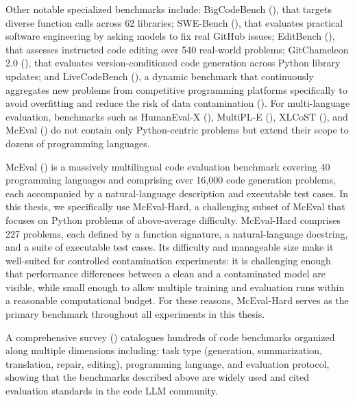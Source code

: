 \documentclass[mscthesis]{usiinfthesis}
\begin{document}
\par\vspace{1em}
Other notable specialized benchmarks include: BigCodeBench (\citet{zhuo2025bigcodebenchbenchmarkingcodegeneration}), that targets diverse function calls across 62 libraries; SWE-Bench (\citet{jimenez2024swebenchlanguagemodelsresolve}), that evaluates practical software engineering by asking models to fix real GitHub issues; EditBench (\citet{chi2025editbenchevaluatingllmabilities}), that assesses instructed code editing over 540 real-world problems; GitChameleon 2.0 (\citet{misra2025gitchameleon20evaluatingai}), that evaluates version-conditioned code generation across Python library updates; and LiveCodeBench (\citet{jain2024livecodebenchholisticcontaminationfree}), a dynamic benchmark that continuously aggregates new problems from competitive programming platforms specifically to avoid overfitting and reduce the risk of data contamination (\citet{koohestani2025benchmarkingaimodelssoftware}). For multi-language evaluation, benchmarks such as HumanEval-X (\citet{zheng2024codegeexpretrainedmodelcode}), MultiPL-E (\citet{cassano2022multiplescalableextensibleapproach}), XLCoST (\citet{koohestani2025benchmarkingaimodelssoftware}), and McEval (\citet{chai2024mcevalmassivelymultilingualcode}) do not contain only Python-centric problems but extend their scope to dozens of programming languages.
\par\vspace{1em}
McEval (\citet{chai2024mcevalmassivelymultilingualcode}) is a massively multilingual code evaluation benchmark covering 40 programming languages and comprising over 16,000 code generation problems, each accompanied by a natural-language description and executable test cases. In this thesis, we specifically use McEval-Hard, a challenging subset of McEval that focuses on Python problems of above-average difficulty. McEval-Hard comprises 227 problems, each defined by a function signature, a natural-language docstring, and a suite of executable test cases. Its difficulty and manageable size make it well-suited for controlled contamination experiments: it is challenging enough that performance differences between a clean and a contaminated model are visible, while small enough to allow multiple training and evaluation runs within a reasonable computational budget. For these reasons, McEval-Hard serves as the primary benchmark throughout all experiments in this thesis.
\par\vspace{1em}
A comprehensive survey (\citet{koohestani2025benchmarkingaimodelssoftware}) catalogues hundreds of code benchmarks organized along multiple dimensions including: task type (generation, summarization, translation, repair, editing), programming language, and evaluation protocol, showing that the benchmarks described above are widely used and cited evaluation standards in the code LLM community. 
\end{document}
